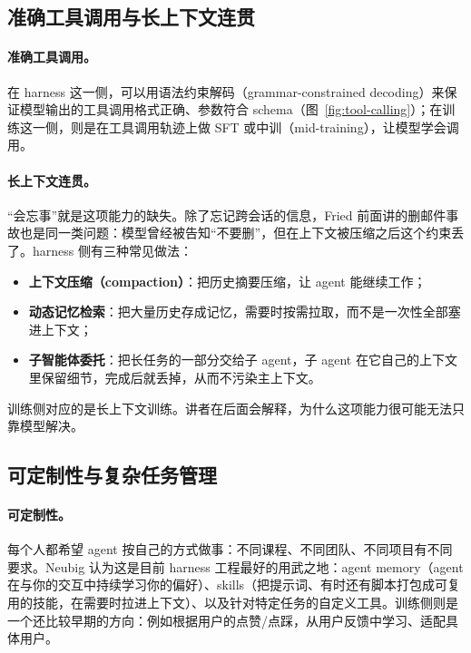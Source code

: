 \documentclass[a4paper]{article}
\begin{document}
\subsection{准确工具调用与长上下文连贯}

\paragraph{准确工具调用。}在 harness 这一侧，可以用语法约束解码（grammar-constrained decoding）来保证模型输出的工具调用格式正确、参数符合 schema（图~\ref{fig:tool-calling}）；在训练这一侧，则是在工具调用轨迹上做 SFT 或中训（mid-training），让模型学会调用。

\paragraph{长上下文连贯。}“会忘事”就是这项能力的缺失。除了忘记跨会话的信息，Fried 前面讲的删邮件事故也是同一类问题：模型曾经被告知“不要删”，但在上下文被压缩之后这个约束丢了。harness 侧有三种常见做法：

\begin{itemize}
\item \textbf{上下文压缩（compaction）}：把历史摘要压缩，让 agent 能继续工作；
\item \textbf{动态记忆检索}：把大量历史存成记忆，需要时按需拉取，而不是一次性全部塞进上下文；
\item \textbf{子智能体委托}：把长任务的一部分交给子 agent，子 agent 在它自己的上下文里保留细节，完成后就丢掉，从而不污染主上下文。
\end{itemize}

训练侧对应的是长上下文训练。讲者在后面会解释，为什么这项能力很可能无法只靠模型解决。

\subsection{可定制性与复杂任务管理}

\paragraph{可定制性。}每个人都希望 agent 按自己的方式做事：不同课程、不同团队、不同项目有不同要求。Neubig 认为这是目前 harness 工程最好的用武之地：agent memory（agent 在与你的交互中持续学习你的偏好）、skills（把提示词、有时还有脚本打包成可复用的技能，在需要时拉进上下文）、以及针对特定任务的自定义工具。训练侧则是一个还比较早期的方向：例如根据用户的点赞/点踩，从用户反馈中学习、适配具体用户。
\end{document}
